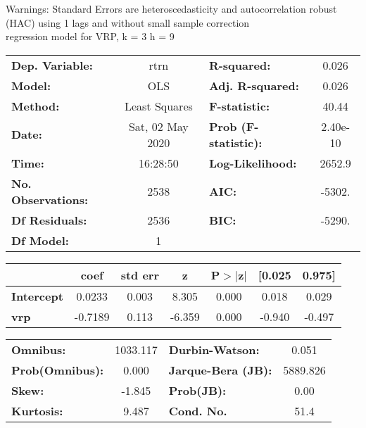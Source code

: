 Warnings: \newline
 [1] Standard Errors are heteroscedasticity and autocorrelation robust (HAC) using 1 lags and without small sample correction\\ 

regression model for VRP, k = 3 h = 9\begin{center}
\begin{tabular}{lclc}
\toprule
\textbf{Dep. Variable:}    &       rtrn       & \textbf{  R-squared:         } &     0.026   \\
\textbf{Model:}            &       OLS        & \textbf{  Adj. R-squared:    } &     0.026   \\
\textbf{Method:}           &  Least Squares   & \textbf{  F-statistic:       } &     40.44   \\
\textbf{Date:}             & Sat, 02 May 2020 & \textbf{  Prob (F-statistic):} &  2.40e-10   \\
\textbf{Time:}             &     16:28:50     & \textbf{  Log-Likelihood:    } &    2652.9   \\
\textbf{No. Observations:} &        2538      & \textbf{  AIC:               } &    -5302.   \\
\textbf{Df Residuals:}     &        2536      & \textbf{  BIC:               } &    -5290.   \\
\textbf{Df Model:}         &           1      & \textbf{                     } &             \\
\bottomrule
\end{tabular}
\begin{tabular}{lcccccc}
                   & \textbf{coef} & \textbf{std err} & \textbf{z} & \textbf{P$> |$z$|$} & \textbf{[0.025} & \textbf{0.975]}  \\
\midrule
\textbf{Intercept} &       0.0233  &        0.003     &     8.305  &         0.000        &        0.018    &        0.029     \\
\textbf{vrp}       &      -0.7189  &        0.113     &    -6.359  &         0.000        &       -0.940    &       -0.497     \\
\bottomrule
\end{tabular}
\begin{tabular}{lclc}
\textbf{Omnibus:}       & 1033.117 & \textbf{  Durbin-Watson:     } &    0.051  \\
\textbf{Prob(Omnibus):} &   0.000  & \textbf{  Jarque-Bera (JB):  } & 5889.826  \\
\textbf{Skew:}          &  -1.845  & \textbf{  Prob(JB):          } &     0.00  \\
\textbf{Kurtosis:}      &   9.487  & \textbf{  Cond. No.          } &     51.4  \\
\bottomrule
\end{tabular}
\end{center}


